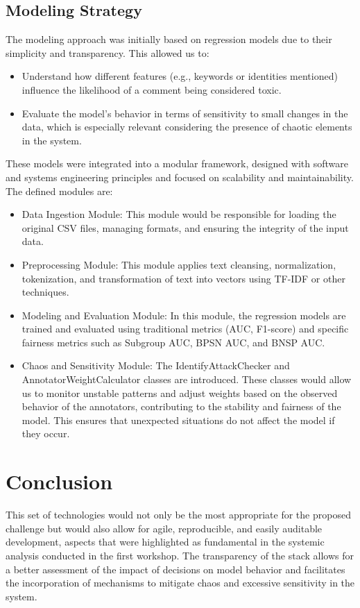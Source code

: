 \documentclass[conference]{IEEEtran}
\begin{document}
\subsection{Modeling Strategy}
The modeling approach was initially based on regression models due to their simplicity and transparency. This allowed us to:
\begin{itemize}
\item Understand how different features (e.g., keywords or identities mentioned) influence the likelihood of a comment being considered toxic.
\item Evaluate the model's behavior in terms of sensitivity to small changes in the data, which is especially relevant considering the presence of chaotic elements in the system.
\end{itemize}
These models were integrated into a modular framework, designed with software and systems engineering principles and focused on scalability and maintainability. The defined modules are:
\begin{itemize}
\item Data Ingestion Module: This module would be responsible for loading the original CSV files, managing formats, and ensuring the integrity of the input data.
\item Preprocessing Module: This module applies text cleansing, normalization, tokenization, and transformation of text into vectors using TF-IDF or other techniques.
\item Modeling and Evaluation Module: In this module, the regression models are trained and evaluated using traditional metrics (AUC, F1-score) and specific fairness metrics such as Subgroup AUC, BPSN AUC, and BNSP AUC.
\item Chaos and Sensitivity Module: The IdentifyAttackChecker and AnnotatorWeightCalculator classes are introduced. These classes would allow us to monitor unstable patterns and adjust weights based on the observed behavior of the annotators, contributing to the stability and fairness of the model. This ensures that unexpected situations do not affect the model if they occur.
\end{itemize}
\section{Conclusion}
This set of technologies would not only be the most appropriate for the proposed challenge but would also allow for agile, reproducible, and easily auditable development, aspects that were highlighted as fundamental in the systemic analysis conducted in the first workshop. The transparency of the stack allows for a better assessment of the impact of decisions on model behavior and facilitates the incorporation of mechanisms to mitigate chaos and excessive sensitivity in the system.
\end{document}
